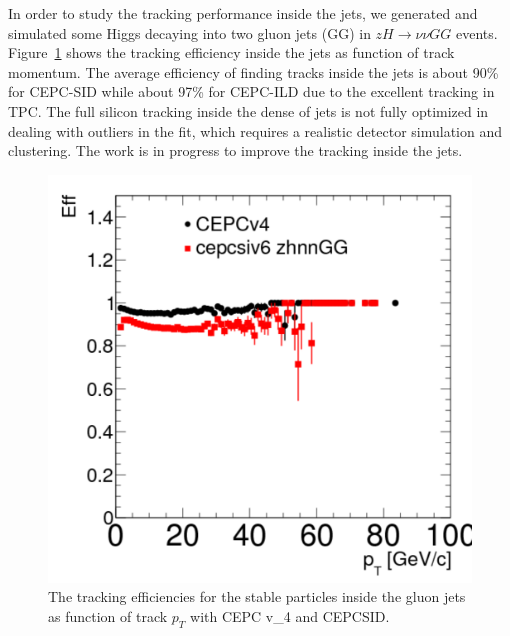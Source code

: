 In order to study the tracking performance inside the jets, we generated and simulated some Higgs decaying into two gluon jets (GG) in 
$zH\rightarrow \nu\nu GG$ events. Figure~\ref{fig:glgl} shows the tracking efficiency inside the jets as function of track momentum.
The average efficiency of finding tracks inside the jets is about 90\% for CEPC-SID while about 97\% for 
CEPC-ILD due to the excellent tracking in TPC. The full silicon tracking inside the dense of jets is not fully optimized in 
dealing with outliers in the fit, which requires a realistic detector simulation and clustering. The work is in progress to improve
the tracking inside the jets.  
 
\begin{figure}[hbtp]
\begin{center}
\includegraphics[width=0.45\textheight,keepaspectratio]{Figures/TrackingSystem/FullSilicon/Plot_zhnnGG_Eff_Pt.pdf}
\caption{The tracking efficiencies for the stable particles inside the gluon jets as 
function of track $p_T$ with CEPC v\_4 and CEPCSID.\label{fig:glgl}}
\end{center}
\end{figure}

